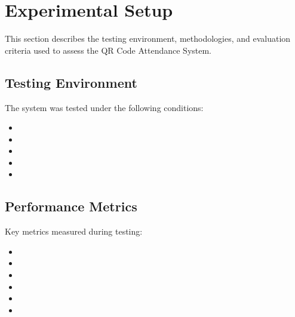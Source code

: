 \section{Experimental Setup}
\begin{infobox}
This section describes the testing environment, methodologies, and evaluation criteria used to assess the QR Code Attendance System.
\end{infobox}

\subsection{Testing Environment}
\textcolor{TextBlack}{
    The system was tested under the following conditions:
    \begin{itemize}
        \item {}
        \item {}
        \item {}
        \item {}
        \item {}
    \end{itemize}
}

\subsection{Performance Metrics}
\begin{notebox}
Key metrics measured during testing:
\begin{itemize}
    \item {}
    \item {}
    \item {}
    \item {}
    \item {}
    \item {}
\end{itemize}
\end{notebox}
